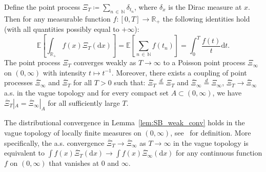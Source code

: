\documentclass[AHL,Unicode,longabstracts,published]{cedram}
\newcommand\N{\mathbb{N}}
\newcommand\R{\mathbb{R}}
\newcommand\E{\mathds{E}}
\newcommand\1{\mathds{1}}
\newcommand\D{\mathrm{d}}
\newcommand\eqd{\overset{d}{=}}
\newcommand\ov[1]{\overline{#1}}
\begin{document}
\begin{lemm}\label{lem:SB_weak_conv}
Define the point process $\Xi_T\coloneqq \sum_{n\,\in\,\N}\delta_{t_n}$, where $\delta_x$ is the Dirac measure at $x$. Then for any measurable function $f:[0,T]\to\R_+$ the following identities hold (with all quantities possibly equal to $+\infty$):
\begin{equation}\label{eq:SB_nnt}
\E\left[\int_{\R_+} f(x)\Xi_T(\D x)\right] =\E\left[\sum_{n\,\in\,\N}f(t_n)\right] =\int_0^T \frac{f(t)}{t}\D t.
\end{equation}
The point process $\Xi_T$ converges weakly as $T\to\infty$ to a Poisson point process $\Xi_\infty$ on $(0,\infty)$ with intensity $t\mapsto t^{-1}$. Moreover, there exists a coupling of point processes $\ov\Xi_\infty$ and $\ov\Xi_T$ for all $T>0$ such that: $\ov\Xi_T\eqd\Xi_T$ and $\ov\Xi_\infty\eqd\Xi_\infty$, $\ov\Xi_T\to\ov\Xi_\infty$ a.s. in the vague topology and for every compact set $A\subset(0,\infty)$, we have $\ov\Xi_T|_A=\ov\Xi_\infty|_A$ for all sufficiently large $T$.
\end{lemm}

The distributional convergence in Lemma~\ref{lem:SB_weak_conv} holds in the vague topology of locally finite measures on $(0,\infty)$, see~\cite[Chapter~16, p.~316]{MR1876169} for definition. More specifically, the a.s. convergence $\ov\Xi_T\to\ov\Xi_\infty$ as $T\to\infty$ in the vague topology is equivalent to $\int f(x)\ov\Xi_T(\D x)\to\int f(x)\ov\Xi_\infty(\D x)$ for any continuous function $f$ on $(0,\infty)$ that vanishes at $0$ and $\infty$.
\end{document}
